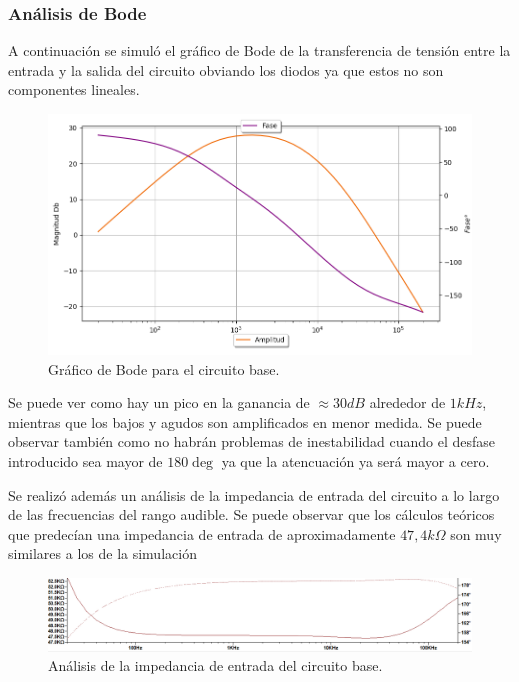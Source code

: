 \subsubsection{Análisis de Bode}
A continuación se simuló el gráfico de Bode de la transferencia de tensión entre la entrada y la salida del circuito obviando los diodos ya que estos no son componentes lineales.
\begin{figure}[H]
	\centering
	\includegraphics[width=1\textwidth, trim={0 0 0 0}, clip]{Ejercicio5/Imagenes/Circuito_base/Sim/circuito_base_bode.png}
	\caption{Gráfico de Bode para el circuito base.}
	\label{fig:sim_base}
\end{figure}

Se puede ver como hay un pico en la ganancia de $\approx 30dB$ alrededor de $1kHz$, mientras que los bajos y agudos son amplificados en menor medida. Se puede observar también como no habrán problemas de inestabilidad cuando el desfase introducido sea mayor de $180\deg$ ya que la atencuación ya será mayor a cero.

Se realizó además un análisis de la impedancia de entrada del circuito a lo largo de las frecuencias del rango audible. Se puede observar que los cálculos teóricos que predecían una impedancia de entrada de aproximadamente $47,4k\Omega$ son muy similares a los de la simulación

\begin{center}
\begin{figure}[H]
	\hspace{-5em}
	\includegraphics[width=1.3\textwidth, trim={0 0 0 0}, clip, scale=2]{Ejercicio5/Imagenes/Circuito_base/Sim/circuito_base_zin.png}
	\caption{Análisis de la impedancia de entrada del circuito base.}
	\label{fig:sim_base}
\end{figure}
\end{center}

